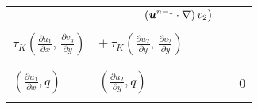 \documentclass[a4paper,12pt]{article}
\newcommand{\bfu}{\mbox{\boldmath $u$}}
\begin{document}
\begin{landscape}
\begin{figure}[p]
\begin{tabular}{|l|l|l||l|}
& $\displaystyle{\qquad \qquad 
    \left. (\bfu^{n-1}\cdot\nabla)\,v_2\right)}$ &  & \\
& & & \\
$\displaystyle{\tau_K\left(\frac{\partial u_1}{\partial x}, \, \frac{\partial v_y}{\partial y} \right)}$ & $\displaystyle{ + \,\tau_K\left(\frac{\partial u_2}{\partial y}, \, \frac{\partial v_2}{\partial y} \right)}$ & & \\
& & & \\
\hline
& & & \\
$\displaystyle{(\frac{\partial u_1}{\partial x}, q)}$ & $\displaystyle{(\frac{\partial u_2}{\partial y}, q)}$ &  & 0 \\ 
& & & \\
\hline
\end{tabular}
\end{figure}
\end{landscape}
\end{document}
